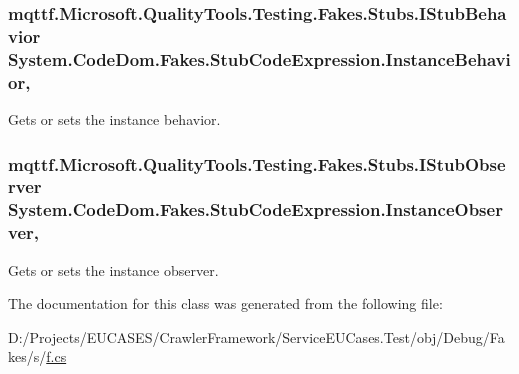 \hypertarget{class_system_1_1_code_dom_1_1_fakes_1_1_stub_code_expression_af6d913f1a67d02f9c71658b00c67e89e}{
\subsubsection[{Instance\-Behavior}]{\setlength{\rightskip}{0pt plus 5cm}mqttf.\-Microsoft.\-Quality\-Tools.\-Testing.\-Fakes.\-Stubs.\-I\-Stub\-Behavior System.\-Code\-Dom.\-Fakes.\-Stub\-Code\-Expression.\-Instance\-Behavior\hspace{0.3cm}{\ttfamily [get]}, {\ttfamily [set]}}}\label{class_system_1_1_code_dom_1_1_fakes_1_1_stub_code_expression_af6d913f1a67d02f9c71658b00c67e89e}


Gets or sets the instance behavior.

\hypertarget{class_system_1_1_code_dom_1_1_fakes_1_1_stub_code_expression_ac7002f9a26a5dbc4f3dcc74994d3c807}{
\subsubsection[{Instance\-Observer}]{\setlength{\rightskip}{0pt plus 5cm}mqttf.\-Microsoft.\-Quality\-Tools.\-Testing.\-Fakes.\-Stubs.\-I\-Stub\-Observer System.\-Code\-Dom.\-Fakes.\-Stub\-Code\-Expression.\-Instance\-Observer\hspace{0.3cm}{\ttfamily [get]}, {\ttfamily [set]}}}\label{class_system_1_1_code_dom_1_1_fakes_1_1_stub_code_expression_ac7002f9a26a5dbc4f3dcc74994d3c807}


Gets or sets the instance observer.



The documentation for this class was generated from the following file\-:\begin{DoxyCompactItemize}
\item 
D\-:/\-Projects/\-E\-U\-C\-A\-S\-E\-S/\-Crawler\-Framework/\-Service\-E\-U\-Cases.\-Test/obj/\-Debug/\-Fakes/s/\hyperlink{s_2f_8cs}{f.\-cs}\end{DoxyCompactItemize}
